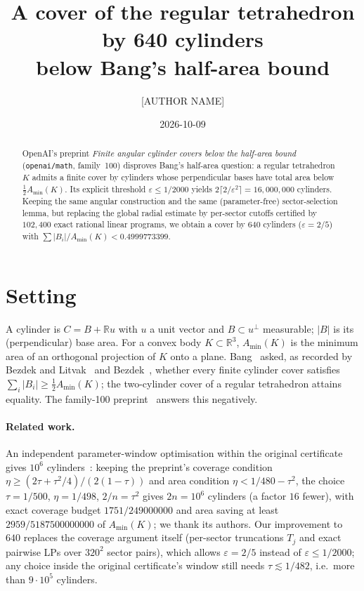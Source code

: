\documentclass[11pt]{amsart}
\title[A 640-cylinder cover below Bang's half-area bound]{A cover of the regular tetrahedron by 640 cylinders\\ below Bang's half-area bound}
\author{[AUTHOR NAME]}
\date{2026-10-09}
\theoremstyle{remark}
\newcommand{\R}{\mathbb{R}}
\newcommand{\eps}{\varepsilon}
\begin{document}
\begin{abstract}\sloppy
OpenAI's preprint \emph{Finite angular cylinder covers below the half-area bound}
(\texttt{openai/math}, family~100) disproves Bang's half-area question: a regular tetrahedron $K$ admits
a finite cover by cylinders whose perpendicular bases have total area below $\frac12A_{\min}(K)$.
Its explicit threshold $\eps\le1/2000$ yields $2\lceil2/\eps^2\rceil=16{,}000{,}000$ cylinders.
Keeping the same angular construction and the same (parameter-free) sector-selection lemma,
but replacing the global radial estimate by per-sector cutoffs certified by $102{,}400$ exact
rational linear programs, we obtain a cover by $640$ cylinders ($\eps=2/5$) with
$\sum|B_i|/A_{\min}(K)<0.4999773399$.
\end{abstract}
\maketitle

\section{Setting}
A cylinder is $C=B+\R u$ with $u$ a unit vector and $B\subset u^\perp$ measurable; $|B|$ is its
(perpendicular) base area. For a convex body $K\subset\R^3$, $A_{\min}(K)$ is the minimum area of
an orthogonal projection of $K$ onto a plane. Bang~\cite{Bang1951} asked, as recorded by Bezdek and
Litvak~\cite[Introduction]{BL2009} and Bezdek~\cite[Problem~3.1]{Bezdek2009}, whether every finite
cylinder cover satisfies $\sum_i|B_i|\ge\frac12A_{\min}(K)$; the two-cylinder cover of a regular
tetrahedron attains equality. The family-100 preprint~\cite{OAI100} answers this negatively.

\paragraph{Related work.} An independent parameter-window optimisation within the original
certificate gives $10^6$ cylinders~\cite{SupsupNMR}: keeping the preprint's coverage condition
$\eta\ge(2\tau+\tau^2/4)/(2(1-\tau))$ and area condition $\eta<1/480-\tau^2$, the choice
$\tau=1/500$, $\eta=1/498$, $2/n=\tau^2$ gives $2n=10^6$ cylinders (a factor $16$ fewer), with exact
coverage budget $1751/249000000$ and area saving at least $2959/5187500000000$ of $A_{\min}(K)$; we
thank its authors. Our improvement to $640$ replaces the coverage argument itself (per-sector
truncations $T_j$ and exact pairwise LPs over $320^2$ sector pairs), which allows $\eps=2/5$ instead
of $\eps\le1/2000$; any choice inside the original certificate's window still needs
$\tau\lesssim1/482$, i.e.\ more than $9\cdot10^5$ cylinders.
\end{document}
